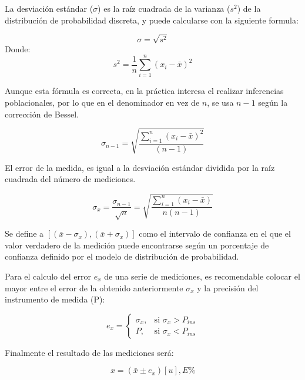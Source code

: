 \documentclass[letter,twoside,11pt]{article}
\begin{document}
La desviación estándar ($\sigma$) es la raíz cuadrada de la varianza ($s^2$) de
la distribución de probabilidad discreta, y puede calcularse con la siguiente
formula:

\begin{equation}
    \sigma = \sqrt{s^2}
\end{equation}
Donde:
\begin{equation}
    s^2 = \frac{1}{n}\sum_{i=1}^{n} (x_i-\bar{x})^2
\end{equation}

Aunque esta fórmula es correcta, en la práctica interesa el realizar inferencias
poblacionales, por lo que en el denominador en vez de $n$, se usa $n-1$ según la
corrección de Bessel.

\begin{equation}
    \sigma_{n-1} = \sqrt{\frac{\sum_{i=1}^{n} (x_i-\bar{x})^2}{(n-1)}}
\end{equation}

El error de la medida, es igual a la desviación estándar dividida por la raíz
cuadrada del número de mediciones.

\begin{equation}
    \sigma_x = \frac{\sigma_{n-1}}{\sqrt{n}}
             = \sqrt{\frac{\sum_{i=1}^{n} (x_i-\bar{x})}{n(n-1)}}
\end{equation}

Se define a $[(\bar{x}-\sigma_x), (\bar{x}+\sigma_x)]$ como el intervalo de
confianza en el que el valor verdadero de la medición puede encontrarse según un
porcentaje de confianza definido por el modelo de distribución de probabilidad.

Para el calculo del error $e_x$ de una serie de mediciones, es recomendable
colocar el mayor entre el error de la obtenido anteriormente $\sigma_x$ y la
precisión del instrumento de medida (P):

\begin{equation}
    e_x = \begin{cases}
        \sigma_x, & \mbox{si }\sigma_x > P_{ins} \\
        P,        & \mbox{si }\sigma_x < P_{ins}
    \end{cases}
\end{equation}

Finalmente el resultado de las mediciones será:

\begin{equation}
    x = (\bar{x}\pm e_x)[u], E\%
\end{equation}
\end{document}
